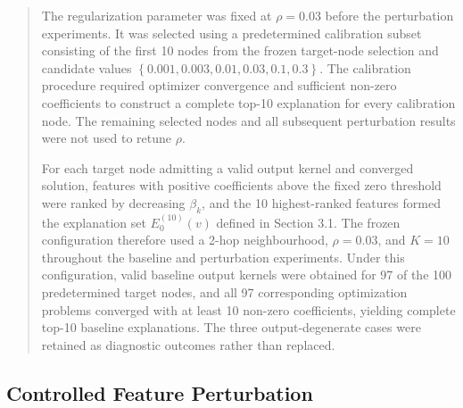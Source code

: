 \documentclass[a4paper]{article}
\begin{document}
\begin{quote}
The regularization parameter was fixed at \(\rho = 0.03\) before the
perturbation experiments. It was selected using a predetermined
calibration subset consisting of the first 10 nodes from the frozen
target-node selection and candidate values
\(\left\{ 0.001,0.003,0.01,0.03,0.1,0.3 \right\}\). The calibration
procedure required optimizer convergence and sufficient non-zero
coefficients to construct a complete top-10 explanation for every
calibration node. The remaining selected nodes and all subsequent
perturbation results were not used to retune \(\rho\).

For each target node admitting a valid output kernel and converged
solution, features with positive coefficients above the fixed zero
threshold were ranked by decreasing \(\beta_{k}\), and the 10
highest-ranked features formed the explanation set \(E_{0}^{(10)}(v)\)
defined in Section 3.1. The frozen configuration therefore used a 2-hop
neighbourhood, \(\rho = 0.03\), and \(K = 10\) throughout the baseline
and perturbation experiments. Under this configuration, valid baseline
output kernels were obtained for 97 of the 100 predetermined target
nodes, and all 97 corresponding optimization problems converged with at
least 10 non-zero coefficients, yielding complete top-10 baseline
explanations. The three output-degenerate cases were retained as
diagnostic outcomes rather than replaced.
\end{quote}

\subsection{Controlled Feature
Perturbation}\label{controlled-feature-perturbation}
\end{document}
